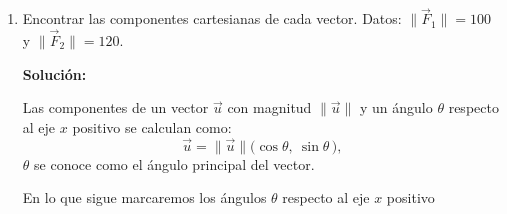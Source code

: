 \documentclass[11pt,a4paper]{article}
\begin{document}
\begin{enumerate}[\hspace{-5mm} 1) ]
\begin{enumerate}[a)]
  Por lo tanto, para $\alpha = 1$ y $\beta = -2$, se satisfacen las tres ecuaciones del sistema. Es decir, estos son los escalares que estábamos buscando. En consecuencia, $\vec{a}$ {\bf sí} es una combinación lineal de $\vec{b}$ y $\vec{c}$. 

\end{enumerate}









\item Encontrar las componentes cartesianas de cada vector. Datos: $\|\vec{F}_1\| = 100$ \quad y \quad $\|\vec{F}_2\| = 120$.


\vspace{-3mm}
\begin{center}
\end{center}

\vspace{-3mm}





\textbf{Solución:}

Las componentes de un vector $\vec{u}$ con magnitud $\|\vec{u}\|$ y un ángulo $\theta$ respecto al eje $x$ positivo se calculan como:
\[
\vec{u} = \|\vec{u}\| \big(\cos\theta ,\  \sin\theta \,  \big),
\]
$\theta$ se conoce como  el ángulo principal del vector.

En lo que sigue marcaremos los ángulos $\theta$ respecto al eje $x$ positivo 

\vspace{-3mm}
\begin{center}
\begin{tikzpicture}[scale=.35, >=stealth]


\end{tikzpicture}
\end{center}
\end{enumerate}
\end{document}
